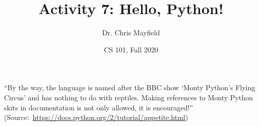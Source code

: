 \documentclass[12pt]{article}
\title{Activity 7: Hello, Python!}
\author{Dr. Chris Mayfield}
\date{CS 101, Fall 2020}
\begin{document}
\maketitle

``By the way, the language is named after the BBC show `Monty Python's Flying Circus' and has nothing to do with reptiles.
Making references to Monty Python skits in documentation is not only allowed, it is encouraged!''
(Source:~\url{https://docs.python.org/2/tutorial/appetite.html})



\end{document}
